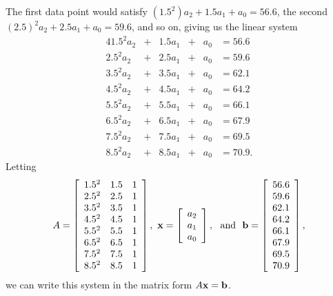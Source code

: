 \begin{example}
	\item The first data point would satisfy $(1.5^2)a_2+1.5a_1+a_0 = 56.6$, the second $(2.5)^2a_2+2.5a_1+a_0 = 59.6$, and so on, giving us the linear system
\begin{alignat*}{4}
{1.5^2}a_2	&{}+{}	&{1.5}a_1	&{}+{}	&a_0 &{}={} 56.6{} \\ 
{2.5^2}a_2	&{}+{}	&{2.5}a_1	&{}+{}	&a_0 &{}={} 59.6{} \\
{3.5^2}a_2	&{}+{}	&{3.5}a_1	&{}+{}	&a_0 &{}={} 62.1{} \\
{4.5^2}a_2	&{}+{}	&{4.5}a_1	&{}+{}	&a_0 &{}={} 64.2{}  \\
{5.5^2}a_2	&{}+{}	&{5.5}a_1	&{}+{}	&a_0 &{}={} 66.1{} \\
{6.5^2}a_2	&{}+{}	&{6.5}a_1	&{}+{}	&a_0 &{}={} 67.9{} \\
{7.5^2}a_2	&{}+{}	&{7.5}a_1	&{}+{}	&a_0 &{}={} 69.5{} \\
{8.5^2}a_2	&{}+{}	&{8.5}a_1	&{}+{}	&a_0 &{}={} 70.9{.}
\end{alignat*}
Letting 
\[A = \left[ \begin{array}{ccc} 1.5^2&1.5&1 \\ 2.5^2&2.5&1 \\ 3.5^2&3.5&1 \\ 4.5^2&4.5&1 \\ 5.5^2&5.5&1 \\ 6.5^2&6.5&1 \\ 7.5^2&7.5&1 \\ 8.5^2&8.5&1 \end{array} \right], \ \mathbf{x} = \left[ \begin{array}{c} a_2\\a_1\\a_0 \end{array} \right], \ \text{ and } \ \mathbf{b}=\left[ \begin{array}{c} 56.6\\59.6\\62.1\\64.2\\66.1\\67.9\\69.5\\70.9 \end{array} \right],\]
we can write this system in the matrix form  $A \mathbf{x} = \mathbf{b}$. 


\end{example}
